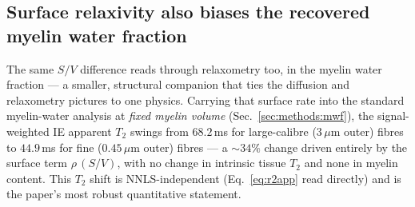 \subsection{Surface relaxivity also biases the recovered myelin water fraction}
\label{sec:results:mwf}

The same $S/V$ difference reads through relaxometry too, in the myelin water fraction --- a
smaller, structural companion that ties the diffusion and relaxometry pictures to one physics.
Carrying that surface rate into the standard myelin-water analysis at \emph{fixed
myelin volume} (Sec.~\ref{sec:methods:mwf}), the signal-weighted IE apparent $T_2$
swings from $68.2$\,ms for large-calibre ($3\,\mu$m outer) fibres to $44.9$\,ms for fine
($0.45\,\mu$m outer) fibres --- a ${\sim}34\%$ change driven entirely by the surface term
$\rho\,(S/V)$, with no change in intrinsic tissue $T_2$ and none in myelin content.
This $T_2$ shift is NNLS-independent (Eq.~\eqref{eq:r2app} read directly) and is the
paper's most robust quantitative statement.

